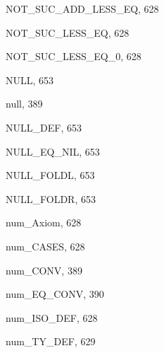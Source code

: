 \begin{theindex}
  \item {\ptt NOT\_SUC\_ADD\_LESS\_EQ}, 628
  \item {\ptt NOT\_SUC\_LESS\_EQ}, 628
  \item {\ptt NOT\_SUC\_LESS\_EQ\_0}, 628
  \item {\ptt NULL}, 653
  \item {\ptt null}, 389
  \item {\ptt NULL\_DEF}, 653
  \item {\ptt NULL\_EQ\_NIL}, 653
  \item {\ptt NULL\_FOLDL}, 653
  \item {\ptt NULL\_FOLDR}, 653
  \item {\ptt num\_Axiom}, 628
  \item {\ptt num\_CASES}, 628
  \item {\ptt num\_CONV}, 389
  \item {\ptt num\_EQ\_CONV}, 390
  \item {\ptt num\_ISO\_DEF}, 628
  \item {\ptt num\_TY\_DEF}, 629

  \indexspace


\end{theindex}
